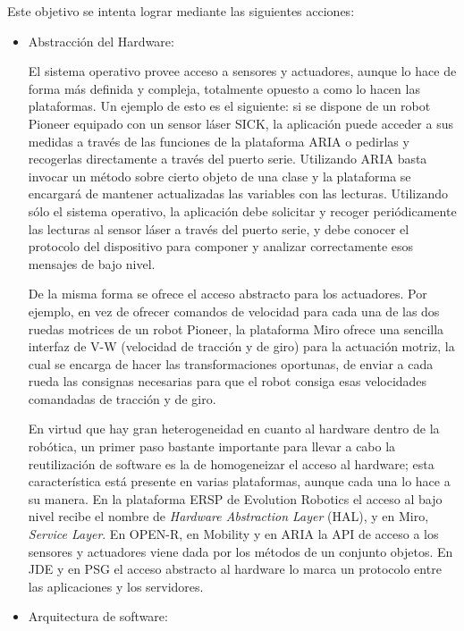 Este objetivo se intenta lograr mediante las siguientes acciones: \cite{canas06programacion}

\begin{itemize}
	\itemsep1pt \parskip1pt 
	\item Abstracción del Hardware:

	El sistema operativo provee acceso a sensores y actuadores, aunque lo hace de forma más definida y compleja, totalmente opuesto a como lo hacen las plataformas. Un ejemplo de esto es el siguiente: si se dispone de un robot Pioneer equipado con un sensor láser SICK, la aplicación puede acceder a sus medidas a través de las funciones de la plataforma ARIA o pedirlas y recogerlas directamente a través del puerto serie. Utilizando ARIA basta invocar un método sobre cierto objeto de una clase y la plataforma se encargará de mantener actualizadas las variables con las lecturas. Utilizando sólo el sistema operativo, la aplicación debe solicitar y recoger periódicamente las lecturas al sensor láser a través del puerto serie, y debe conocer el protocolo del dispositivo para componer y analizar correctamente esos mensajes de bajo nivel.

	De la misma forma se ofrece el acceso abstracto para los actuadores. Por ejemplo, en vez de ofrecer comandos de velocidad para cada una de las dos ruedas motrices de un robot Pioneer, la plataforma Miro ofrece una sencilla interfaz de V-W (velocidad de tracción y de giro) para la actuación motriz, la cual se encarga de hacer las transformaciones oportunas, de enviar a cada rueda las consignas necesarias para que el robot consiga esas velocidades comandadas de tracción y de giro.

	En virtud que hay gran heterogeneidad en cuanto al hardware dentro de la robótica, un primer paso bastante importante para llevar a cabo la reutilización de software es la de homogeneizar el acceso al hardware; esta característica está presente en varias plataformas, aunque cada una lo hace a su manera. En la plataforma ERSP de Evolution Robotics el acceso al bajo nivel recibe el nombre de \textit{Hardware Abstraction Layer} (HAL), y en Miro, \textit{Service Layer}. En OPEN-R, en Mobility y en ARIA la API de acceso a los sensores y actuadores viene dada por los métodos de un conjunto objetos. En JDE y en PSG el acceso abstracto al hardware lo marca un protocolo entre las aplicaciones y los servidores.

	\item Arquitectura de software:


\end{itemize}
